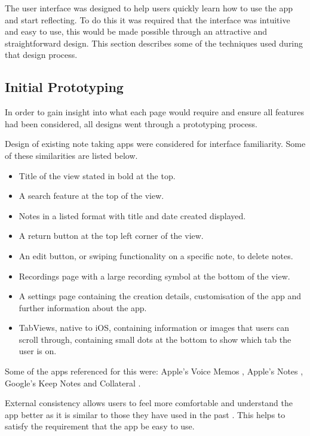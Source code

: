 \documentclass{l4proj}
\begin{document}
The user interface was designed to help users quickly learn how to use the app and start reflecting. To do this it was required that the interface was intuitive and easy to use, this would be made possible through an attractive and straightforward design. This section describes some of the techniques used during that design process.

\subsection{Initial Prototyping}

In order to gain insight into what each page would require and ensure all features had been considered, all designs went through a prototyping process. 

Design of existing note taking apps were considered for interface familiarity. Some of these similarities are listed below.
\begin{itemize}
    \item Title of the view stated in bold at the top.
    \item A search feature at the top of the view.
    \item Notes in a listed format with title and date created displayed.
    \item A return button at the top left corner of the view.
    \item An edit button, or swiping functionality on a specific note, to delete notes.
    \item Recordings page with a large recording symbol at the bottom of the view.
    \item A settings page containing the creation details, customisation of the app and further information about the app.
    \item TabViews, native to iOS, containing information or images that users can scroll through, containing small dots at the bottom to show which tab the user is on.
\end{itemize}

Some of the apps referenced for this were: Apple's Voice Memos \citep{apple_inc_voice_2021}, Apple's Notes \citep{apple_inc_notes_2021}, Google's Keep Notes \citep{google_llc_google_2021} and Collateral \citep{vargas_collateral_2021}.

External consistency allows users to feel more comfortable and understand the app better as it is similar to those they have used in the past \citep{schlatter_visual_2013}. This helps to satisfy the requirement that the app be easy to use. 
\end{document}
